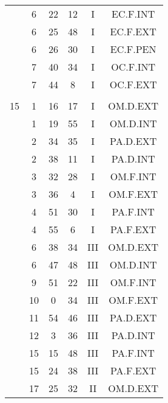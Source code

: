 \documentclass[12pt, a4paper]{article}
\begin{document}
\begin{multicols}{3}
{\begin{tabular}{c c c c c c}
	 	 	 	 & 6 & 22 & 12 & I & EC.F.INT\\%
	 	 	 	 & 6 & 25 & 48 & I & EC.F.EXT\\%
	 	 	 	 & 6 & 26 & 30 & I & EC.F.PEN\\%
	 	 	 	 & 7 & 40 & 34 & I & OC.F.INT\\%
	 	 	 	 & 7 & 44 & 8 & I & OC.F.EXT\\%
	 	 	 	 & & & & & \\%
	 	 	 	15 & 1 & 16 & 17 & I & OM.D.EXT\\%
	 	 	 	 & 1 & 19 & 55 & I & OM.D.INT\\%
	 	 	 	 & 2 & 34 & 35 & I & PA.D.EXT\\%
	 	 	 	 & 2 & 38 & 11 & I & PA.D.INT\\%
	 	 	 	 & 3 & 32 & 28 & I & OM.F.INT\\%
	 	 	 	 & 3 & 36 & 4 & I & OM.F.EXT\\%
	 	 	 	 & 4 & 51 & 30 & I & PA.F.INT\\%
	 	 	 	 & 4 & 55 & 6 & I & PA.F.EXT\\%
	 	 	 	 & 6 & 38 & 34 & III & OM.D.EXT\\%
	 	 	 	 & 6 & 47 & 48 & III & OM.D.INT\\%
	 	 	 	 & 9 & 51 & 22 & III & OM.F.INT\\%
	 	 	 	 & 10 & 0 & 34 & III & OM.F.EXT\\%
	 	 	 	 & 11 & 54 & 46 & III & PA.D.EXT\\%
	 	 	 	 & 12 & 3 & 36 & III & PA.D.INT\\%
	 	 	 	 & 15 & 15 & 48 & III & PA.F.INT\\%
	 	 	 	 & 15 & 24 & 38 & III & PA.F.EXT\\%
	 	 	 	 & 17 & 25 & 32 & II & OM.D.EXT\\%

\end{tabular}}
\end{multicols}
\end{document}
